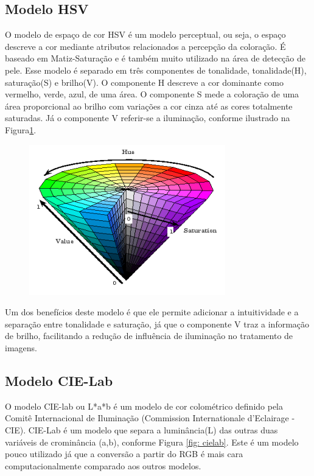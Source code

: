 \subsection{Modelo HSV}
O modelo de espaço de cor HSV é um modelo perceptual, ou seja, o espaço descreve a cor mediante atributos relacionados a percepção da coloração\cite{Deteccao_de_pele_humana_em_imagens_veiculadas_na_web}. É baseado em Matiz-Saturação e é também muito utilizado na área de detecção de pele. Esse modelo é separado em três componentes de tonalidade, tonalidade(H), saturação(S) e brilho(V). O componente H descreve a cor dominante como vermelho, verde, azul, de uma área. O componente S mede a coloração de uma área proporcional ao brilho com variações a cor cinza até as cores totalmente saturadas. Já o componente V referir-se a iluminação, conforme ilustrado na Figura\ref{fig: hsv}.

 \begin{figure}[h]
\caption{}
\centering

\includegraphics[]{Template_Latex_TCC-UNIFTEC/_lib/imagens/HSV.png}

\label{fig: hsv}
\end{figure}

 Um dos benefícios deste modelo é que ele permite adicionar a intuitividade e a separação entre tonalidade e saturação, já que o componente V traz a informação de brilho, facilitando a redução de influência de iluminação no tratamento de imagens\cite{Skin_detection_ashort_tutorial}.
 
 \subsection{Modelo CIE-Lab} 
O modelo CIE-lab ou L*a*b é um modelo de cor colométrico definido pela Comitê Internacional de Iluminação (Commission Internationale d’Eclairage - CIE). CIE-Lab é um modelo que separa a luminância(L) das outras duas variáveis de crominância (a,b), conforme Figura \ref{fig: cielab}. Este é um modelo pouco utilizado já que a conversão a partir do RGB é mais cara computacionalmente \cite{Skin_detection_ashort_tutorial} comparado aos outros modelos.

